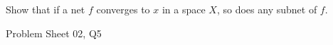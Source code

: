 \begin{samepage}
\begin{ex}
Show that if a net $f$ converges to $x$ in a space $X$, so does any subnet of $f$.
\end{ex}
\begin{source}
Problem Sheet 02, Q5
\end{source}
\end{samepage}
